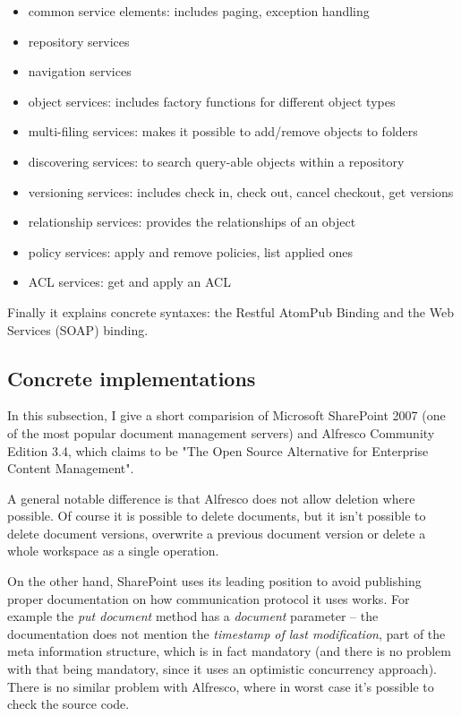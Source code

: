 \begin{itemize}
\item common service elements: includes paging, exception handling
\item repository services
\item navigation services
\item object services: includes factory functions for different object types
\item multi-filing services: makes it possible to add/remove objects to folders
\item discovering services: to search query-able objects within a repository
\item versioning services: includes check in, check out, cancel checkout, get
	versions
\item relationship services: provides the relationships of an object
\item policy services: apply and remove policies, list applied ones
\item ACL services: get and apply an ACL
\end{itemize}

Finally it explains concrete syntaxes: the Restful AtomPub Binding and the Web
Services (SOAP) binding.

\subsection{Concrete implementations}

In this subsection, I give a short comparision of Microsoft SharePoint 2007 (one of
the most popular document management servers) and Alfresco Community Edition 3.4, which claims to be
"The Open Source Alternative for Enterprise Content Management".

A general notable difference is that Alfresco does not allow deletion where
possible. Of course it is possible to delete documents, but it isn't possible
to delete document versions, overwrite a previous document version or delete a
whole workspace as a single operation.

On the other hand, SharePoint uses its leading position to avoid publishing
proper documentation on how communication protocol it uses works. For example
the \emph{put document} method has a \emph{document} parameter -- the
documentation\cite{spdoc} does not mention the \emph{timestamp of last
modification}, part of the meta information structure, which is in fact
mandatory (and there is no problem with that being mandatory, since it uses an
optimistic concurrency approach). There is no similar problem with Alfresco,
where in worst case it's possible to check the source code.

